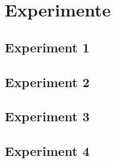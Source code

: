 
\section{Experimente}

\subsection{Experiment 1}
\subsection{Experiment 2}
\subsection{Experiment 3}
\subsection{Experiment 4}

